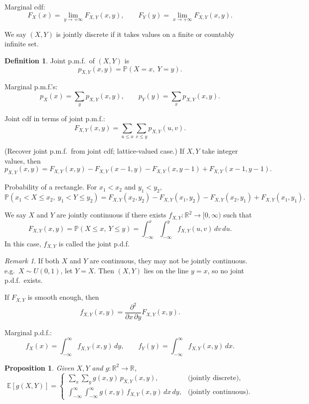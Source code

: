 \documentclass[11pt]{article}
\theoremstyle{plain}
\newtheorem{proposition}[theorem]{Proposition}
\theoremstyle{definition}
\newtheorem{definition}[theorem]{Definition}
\theoremstyle{remark}
\newtheorem{remark}[theorem]{Remark}
\begin{document}
	Marginal cdf:
	\[
	F_X(x)=\lim_{y\to +\infty}F_{X,Y}(x,y),
	\qquad
	F_Y(y)=\lim_{x\to +\infty}F_{X,Y}(x,y).
	\]
	
	We say \((X,Y)\) is jointly discrete if it takes values on a finite or countably infinite set.
	
	\begin{definition}
		Joint p.m.f.\ of \((X,Y)\) is
		\[
		p_{X,Y}(x,y)=\mathbb{P}(X=x,\ Y=y).
		\]
	\end{definition}
	
	Marginal p.m.f.'s:
	\[
	p_X(x)=\sum_{y} p_{X,Y}(x,y),
	\qquad
	p_Y(y)=\sum_{x} p_{X,Y}(x,y).
	\]
	
	Joint cdf in terms of joint p.m.f.:
	\[
	F_{X,Y}(x,y)=\sum_{u\le x}\sum_{v\le y} p_{X,Y}(u,v).
	\]
	
	(Recover joint p.m.f.\ from joint cdf; lattice-valued case.)
	If \(X,Y\) take integer values, then
	\[
	p_{X,Y}(x,y)
	=F_{X,Y}(x,y)-F_{X,Y}(x-1,y)-F_{X,Y}(x,y-1)+F_{X,Y}(x-1,y-1).
	\]
	
	Probability of a rectangle.
	For \(x_1<x_2\) and \(y_1<y_2\),
	\[
	\mathbb{P}(x_1<X\le x_2,\ y_1<Y\le y_2)
	=F_{X,Y}(x_2,y_2)-F_{X,Y}(x_1,y_2)-F_{X,Y}(x_2,y_1)+F_{X,Y}(x_1,y_1).
	\]
	
	We say \(X\) and \(Y\) are jointly continuous if there exists \(f_{X,Y}:\mathbb{R}^2\to[0,\infty)\)
	such that
	\[
	F_{X,Y}(x,y)=\mathbb{P}(X\le x,\ Y\le y)
	=\int_{-\infty}^{x}\int_{-\infty}^{y} f_{X,Y}(u,v)\,dv\,du.
	\]
	In this case, \(f_{X,Y}\) is called the joint p.d.f.
	
	\begin{remark}
		If both \(X\) and \(Y\) are continuous, they may not be jointly continuous.
		e.g.\ \(X\sim U(0,1)\), let \(Y=X\). Then \((X,Y)\) lies on the line \(y=x\), so no joint p.d.f.\ exists.
	\end{remark}
	
	If \(F_{X,Y}\) is smooth enough, then
	\[
	f_{X,Y}(x,y)=\frac{\partial^2}{\partial x\,\partial y}F_{X,Y}(x,y).
	\]
	
	Marginal p.d.f.:
	\[
	f_X(x)=\int_{-\infty}^{\infty} f_{X,Y}(x,y)\,dy,
	\qquad
	f_Y(y)=\int_{-\infty}^{\infty} f_{X,Y}(x,y)\,dx.
	\]
	
	\begin{proposition}
		Given \(X,Y\) and \(g:\mathbb{R}^2\to\mathbb{R}\),
		\[
		\mathbb{E}[g(X,Y)]
		=
		\begin{cases}
			\displaystyle\sum_x\sum_y g(x,y)\,p_{X,Y}(x,y), & \text{(jointly discrete)},\\[12pt]
			\displaystyle\int_{-\infty}^{\infty}\int_{-\infty}^{\infty}
			g(x,y)\,f_{X,Y}(x,y)\,dx\,dy, & \text{(jointly continuous)}.
		\end{cases}
		\]
	\end{proposition}
	
\end{document}
